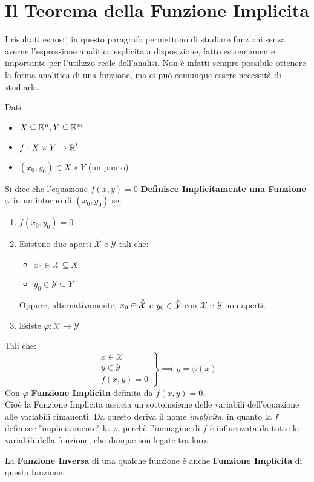\newpage
\section{Il Teorema della Funzione Implicita}
I risultati esposti in questo paragrafo permettono di studiare funzioni senza averne l'espressione analitica esplicita a disposizione, fatto estremamente importante per l'utilizzo reale dell'analisi. Non è infatti sempre possibile ottenere la forma analitica di una funzione, ma ci può comunque essere necessità di studiarla.
\begin{definition}
	\label{def:funz_impl}
	Dati
	\begin{itemize}[noitemsep]
		\item $X \subseteq \mathbb{R}^n, Y \subseteq \mathbb{R}^m$
		\item $f: X \times Y \to \mathbb{R}^l$
		\item $(x_0, y_0) \in X \times Y$ (un punto)
	\end{itemize}
	Si dice che l'equazione $f(x,y) = 0$ \textbf{Definisce Implicitamente una Funzione} $\varphi$ in un intorno di $(x_0,y_0)$ se:
	\begin{enumerate}
		\item $f(x_0,y_0) = 0$
		\item Esistono due aperti $\mathcal{X}$ e $\mathcal{Y}$ tali che:
			\begin{itemize}[noitemsep, topsep=0pt]
				\item $x_0 \in \mathcal{X} \subseteq X$
				\item $y_0 \in \mathcal{Y} \subseteq Y$
			\end{itemize}
			\begin{note}
				Oppure, alternativamente, $x_0 \in \accentset{\circ}{\mathcal{X}}$ e $y_0 \in \accentset{\circ}{\mathcal{Y}}$ con $\mathcal{X}$ e $\mathcal{Y}$ non aperti.
			\end{note}\vspace*{-2ex}
		\item Esiste $\varphi: \mathcal{X} \to \mathcal{Y}$
	\end{enumerate}
	Tali che:
	\[
		\left.
		\begin{array}{l}
			x \in \mathcal{X}\\
			y \in \mathcal{Y}\\
			f(x,y) = 0
		\end{array}
		\right\}
		\implies
		y = \varphi(x)
	\]
	Con $\varphi$ \textbf{Funzione Implicita} definita da $f(x,y)=0$.\\

	Cioè la Funzione Implicita associa un sottoinsieme delle variabili dell'equazione alle variabili rimanenti. Da questo deriva il nome \textit{implicita}, in quanto la $f$ definisce "implicitamente" la $\varphi$, perchè l'immagine di $f$ è influenzata da tutte le variabili della funzione, che dunque son legate tra loro.
	\begin{note}
		La \textbf{Funzione Inversa} di una qualche funzione è anche \textbf{Funzione Implicita} di questa funzione.
	\end{note}
\end{definition}
